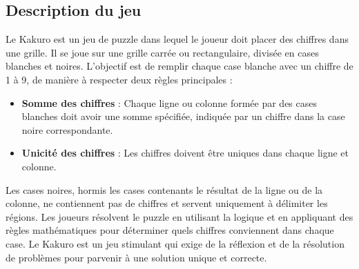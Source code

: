 \subsection{Description du jeu}
Le Kakuro est un jeu de puzzle dans lequel le joueur doit placer des chiffres dans une grille. Il se joue sur une grille carrée ou rectangulaire, divisée en cases blanches et noires. L'objectif est de remplir chaque case blanche avec un chiffre de 1 à 9, de manière à respecter deux règles principales :
\begin{itemize}
\item \textbf{Somme des chiffres} : Chaque ligne ou colonne formée par des cases blanches doit avoir une somme spécifiée, indiquée par un chiffre dans la case noire correspondante.
\item \textbf{Unicité des chiffres} : Les chiffres doivent être uniques dans chaque ligne et colonne.
\end{itemize}
Les cases noires, hormis les cases contenants le résultat de la ligne ou de la colonne, ne contiennent pas de chiffres et servent uniquement à délimiter les régions. Les joueurs résolvent le puzzle en utilisant la logique et en appliquant des règles mathématiques pour déterminer quels chiffres conviennent dans chaque case. Le Kakuro est un jeu stimulant qui exige de la réflexion et de la résolution de problèmes pour parvenir à une solution unique et correcte.